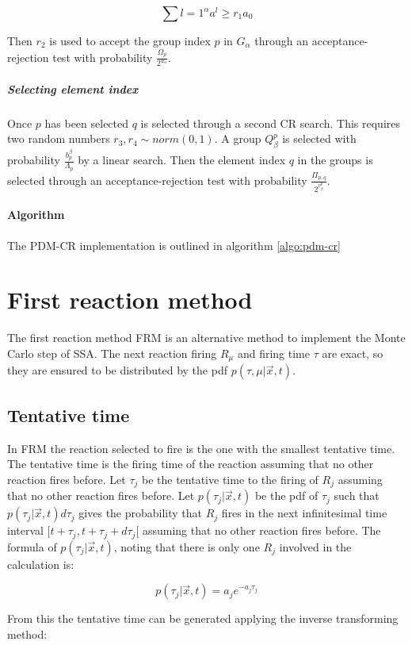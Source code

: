       $$\sum l = 1^\alpha a^l\ge r_1a_0$$

      Then $r_2$ is used to accept the group index $p$ in $G_\alpha$ through an acceptance-rejection test with probability $\frac{\Omega_p}{2^{u_\alpha}}$.

      \subparagraph{Selecting element index}
      Once $p$ has been selected $q$ is selected through a second CR search.
      This requires two random numbers $r_3,r_4\sim norm(0,1)$.
      A group $Q_\beta^p$ is selected with probability $\frac{b_p^\beta}{\Lambda_p}$ by a linear search.
      Then the element index $q$ in the groups is selected through an acceptance-rejection test with probability $\frac{\Pi_{p,q}}{2^{v_\beta^p}}$.

    \paragraph{Algorithm}
    The PDM-CR implementation is outlined in algorithm \ref{algo:pdm-cr}

    

\section{First reaction method}
The first reaction method FRM is an alternative method to implement the Monte Carlo step of SSA.
The next reaction firing $R_\mu$ and firing time $\tau$ are exact, so they are ensured to be distributed by the pdf $p(\tau, \mu|\vec{x},t)$.

  \subsection{Tentative time}
  In FRM the reaction selected to fire is the one with the smallest tentative time.
  The tentative time is the firing time of the reaction assuming that no other reaction fires before.
  Let $\tau_j$ be the tentative time to the firing of $R_j$ assuming that no other reaction fires before.
  Let $p(\tau_j|\vec{x}, t)$ be the pdf of $\tau_j$ such that $p(\tau_j|\vec{x},t)d\tau_j$ gives the probability that $R_j$ fires in the next infinitesimal time interval $[t+\tau_j, t+\tau_j+d\tau_j[$ assuming that no other reaction fires before.
  The formula of $p(\tau_j|\vec{x},t)$, noting that there is only one $R_j$ involved in the calculation is:

  $$p(\tau_j|\vec{x},t) = a_je^{-a_j\tau_j}$$

  From this the tentative time can be generated applying the inverse transforming method:

